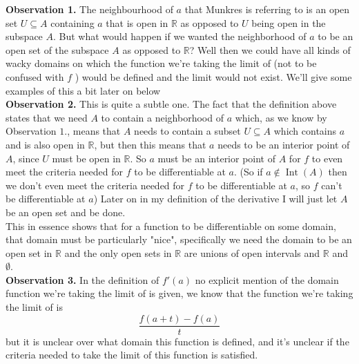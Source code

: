 \documentclass[12pt]{article}
\theoremstyle{definition}
\numberwithin{theorem}{subsection}
\numberwithin{corollary}{subsection}
\theoremstyle{remark}
\theoremstyle{point}
\begin{document}
	\textbf{Observation 1.}  The neighbourhood of $a$ that Munkres is referring to is an open set $U \subseteq A$  containing $a$ that is open in $\mathbb{R}$ as opposed to $U$ being open in the subspace $A$. But what would happen if we wanted the neighborhood of $a$ to be an open set of the subspace $A$ as opposed to $\mathbb{R}$? Well then we could have all kinds of wacky domains on which the function  we're taking the limit of (not to be confused with $f$ ) would be defined and the limit would not exist. We'll give some examples of this a bit later on below \\
	
	\textbf{Observation 2.} This is quite a subtle one. The fact that the definition above states that we need $A$ to contain a neighborhood of $a$ which, as we know by Observation $1.$, means that $A$ needs to contain a subset $U \subseteq A$ which contains $a$ and is also open in $\mathbb{R}$, but then this means that $a$ needs to be an interior point of $A$, since $U$ must be open in $\mathbb{R}$. So $a$ must be an interior point of $A$ for $f$ to even meet the criteria needed for $f$ to be differentiable at $a$. (So if $a\not\in \operatorname{Int}(A)$ then we don't even meet the criteria needed for $f$ to be differentiable at $a$, so $f$ can't be differentiable at $a$) Later on in my definition of the derivative I will just let $A$ be an open set and be done. \\
	
	This in essence shows that for a function to be differentiable on some domain, that domain must be particularly "nice", specifically we need the domain to be an open set in $\mathbb{R}$ and the only open sets in $\mathbb{R}$ are unions of open intervals and $\mathbb{R}$ and $\emptyset$. \\ 
		
	\textbf{Observation 3.} In the definition of $f'(a)$ no explicit mention of the domain function we're taking the limit of is given, we know that the function we're taking the limit of is $$\frac{f(a+t) - f(a)}{t}$$ but it is unclear over what domain this function is defined, and it's unclear if the criteria needed to take the limit of this function is satisfied. \\
	
\end{document}
